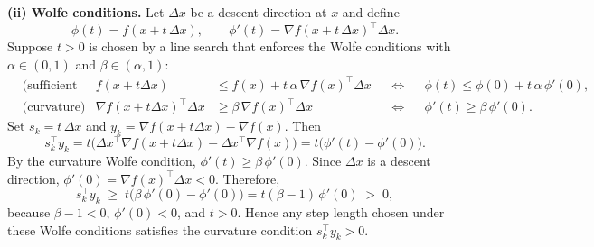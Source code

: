 \documentclass[11pt]{article}
\begin{document}
\smallskip
\textbf{(ii) Wolfe conditions.}
Let \(\Delta x\) be a descent direction at \(x\) and define
\[
\phi(t)=f(x+t\,\Delta x), \qquad \phi'(t)=\nabla f(x+t\,\Delta x)^{\!\top}\Delta x .
\]
Suppose \(t>0\) is chosen by a line search that enforces the Wolfe conditions with
\(\alpha\in(0,1)\) and \(\beta\in(\alpha,1)\):
\begin{align*}
&\text{(sufficient decrease)} & f(x+t\Delta x) &\le f(x)+ t\,\alpha\,\nabla f(x)^{\!\top}\Delta x &&\iff&& \phi(t)\le \phi(0)+ t\,\alpha\,\phi'(0),\\
&\text{(curvature)} & \nabla f(x+t\Delta x)^{\!\top}\Delta x &\ge \beta\,\nabla f(x)^{\!\top}\Delta x &&\iff&& \phi'(t)\ge \beta\,\phi'(0).
\end{align*}
Set \(s_k=t\,\Delta x\) and \(y_k=\nabla f(x+t\Delta x)-\nabla f(x)\).
Then
\[
s_k^{\top}y_k
= t\Big(\Delta x^{\!\top}\nabla f(x+t\Delta x)-\Delta x^{\!\top}\nabla f(x)\Big)
= t\big(\phi'(t)-\phi'(0)\big).
\]
By the curvature Wolfe condition,
\(\phi'(t)\ge \beta\,\phi'(0)\).
Since \(\Delta x\) is a descent direction, \(\phi'(0)=\nabla f(x)^{\!\top}\Delta x<0\).
Therefore,
\[
s_k^{\top}y_k \;\ge\; t\big(\beta\,\phi'(0)-\phi'(0)\big)
= t(\beta-1)\,\phi'(0) \;>\; 0,
\]
because \(\beta-1<0\), \(\phi'(0)<0\), and \(t>0\).
Hence any step length chosen under these Wolfe conditions satisfies the curvature condition \(s_k^{\top}y_k>0\).
\end{document}
